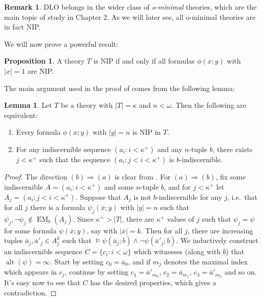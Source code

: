 \documentclass[a4paper]{report}
\newcommand{\ind}{\hspace{15pt}}
\newcommand{\x}{\overline{x}}
\renewcommand{\a}{\overline{a}}
\renewcommand{\implies}{\Rightarrow}
\DeclareMathOperator{\EM}{EM}
\DeclareMathOperator{\alt}{alt}
\theoremstyle{definition}
\newtheorem{lem}[thm]{Lemma}
\newtheorem{prop}[thm]{Proposition}
\theoremstyle{remstyle}
\newtheorem{rem}[thm]{Remark}
\begin{document}
\begin{rem}
	DLO belongs in the wider class of \emph{o-minimal} theories, which are the main topic of study in Chapter 2. As we will later see, all o-minimal theories are in fact NIP.
\end{rem}

\ind We will now prove a powerful result:

\begin{prop}\label{nip|y|=1}
	A theory $T$ is NIP if and only if all formulas $\phi(x;y)$ with $|x|=1$ are NIP.
\end{prop}

\ind The main argument used in the proof of  comes from the following lemma:

\begin{lem}\label{|y|=n}
	Let $T$ be a theory with $|T|=\kappa$ and $n<\omega$. Then the following are equivalent:
	\begin{enumerate}[label=(\alph*)]
		\item Every formula $\phi(x;y)$ with $|y|=n$ is NIP in $T$.
		\item For any indiscernible sequence $(a_i:i<\kappa^+)$ and any $n$-tuple $b$, there exists $j<\kappa^+$ such that the sequence $(a_i:j<i<\kappa^{+})$ is $b$-indiscernible.
	\end{enumerate}
\end{lem}

\begin{proof}
	The direction $(b)\implies(a)$ is clear from . For $(a)\implies (b)$, fix some indiscernible $A=(a_i:i<\kappa^+)$ and some $n$-tuple $b$, and for $j <\kappa^+$ let $A_j=(a_i:j<i<\kappa^+)$. Suppose that $A_j$ is not $b$-indiscernible for any $j$, i.e.\ that for all $j$ there is a formula $\psi_j(\x;y)$ with $|y|=n$ such that $\psi_j,\neg\psi_j\not\in\EM_b(A_j)$. Since $\kappa^{+}>|T|$, there are $\kappa^{+}$ values of $j$ such that $\psi_j=\psi$ for some formula $\psi(\x;y)$, say with $|\x|=k$. Then for all $j$, there are increasing tuples $\a_j, \a'_j\in A^k_j$ such that $\models\psi(\a_j;b)\wedge\neg\psi(\a'_j;b)$. We inductively construct an indiscernible sequence $C=\{c_i:i<\omega\}$ which witnesses (along with $b$) that $\alt(\psi)=\infty$. Start by setting $c_0=\a_0$, and if $m_j$ denotes the maximal index which appears in $c_j$, continue by setting $c_1=\a'_{m_0}$, $c_2=\a_{m_1}$, $c_3=\a'_{m_2}$ and so on. It's easy now to see that $C$ has the desired properties, which gives a contradiction.
\end{proof}
\end{document}
